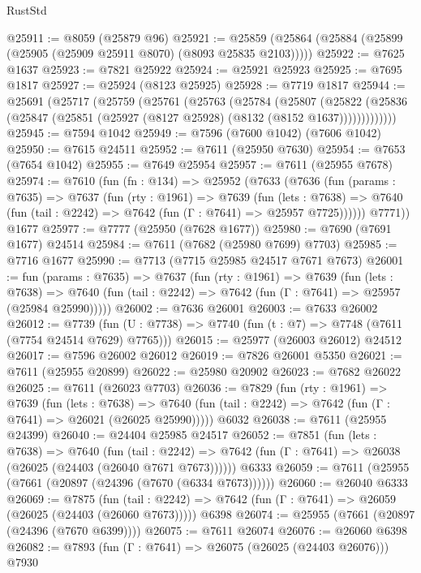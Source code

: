 \begin{lexlean}{RustStd}
\begin{coremodule}
@25911 := @8059 (@25879 @96)
@25921 := @25859 (@25864 (@25884 (@25899 (@25905 (@25909 @25911 @8070) (@8093 @25835 @2103)))))
@25922 := @7625 @1637
@25923 := @7821 @25922
@25924 := @25921 @25923
@25925 := @7695 @1817
@25927 := @25924 (@8123 @25925)
@25928 := @7719 @1817
@25944 := @25691
    (@25717
      (@25759
        (@25761
          (@25763
            (@25784
              (@25807
                (@25822
                  (@25836 (@25847 (@25851 (@25927 (@8127 @25928) (@8132 (@8152 @1637)))))))))))))
@25945 := @7594 @1042
@25949 := @7596 (@7600 @1042) (@7606 @1042)
@25950 := @7615 @24511
@25952 := @7611 (@25950 @7630)
@25954 := @7653 (@7654 @1042)
@25955 := @7649 @25954
@25957 := @7611 (@25955 @7678)
@25974 := @7610
    (fun (fn : @134) =>
    @25952
      (@7633
        (@7636
          (fun (params : @7635) =>
          @7637
            (fun (rty : @1961) =>
            @7639
              (fun (lets : @7638) =>
              @7640 (fun (tail : @2242) => @7642 (fun (Γ : @7641) => @25957 @7725))))))
        @7771))
    @1677
@25977 := @7777 (@25950 (@7628 @1677))
@25980 := @7690 (@7691 @1677) @24514
@25984 := @7611 (@7682 (@25980 @7699) @7703)
@25985 := @7716 @1677
@25990 := @7713 (@7715 @25985 @24517 @7671 @7673)
@26001 := fun (params : @7635) =>
  @7637
    (fun (rty : @1961) =>
    @7639
      (fun (lets : @7638) =>
      @7640 (fun (tail : @2242) => @7642 (fun (Γ : @7641) => @25957 (@25984 @25990)))))
@26002 := @7636 @26001
@26003 := @7633 @26002
@26012 := @7739
    (fun (U : @7738) => @7740 (fun (t : @7) => @7748 (@7611 (@7754 @24514 @7629) @7765)))
@26015 := @25977 (@26003 @26012) @24512
@26017 := @7596 @26002 @26012
@26019 := @7826 @26001 @5350
@26021 := @7611 (@25955 @20899)
@26022 := @25980 @20902
@26023 := @7682 @26022
@26025 := @7611 (@26023 @7703)
@26036 := @7829
    (fun (rty : @1961) =>
    @7639
      (fun (lets : @7638) =>
      @7640 (fun (tail : @2242) => @7642 (fun (Γ : @7641) => @26021 (@26025 @25990)))))
    @6032
@26038 := @7611 (@25955 @24399)
@26040 := @24404 @25985 @24517
@26052 := @7851
    (fun (lets : @7638) =>
    @7640
      (fun (tail : @2242) =>
      @7642 (fun (Γ : @7641) => @26038 (@26025 (@24403 (@26040 @7671 @7673))))))
    @6333
@26059 := @7611 (@25955 (@7661 (@20897 (@24396 (@7670 (@6334 @7673))))))
@26060 := @26040 @6333
@26069 := @7875
    (fun (tail : @2242) => @7642 (fun (Γ : @7641) => @26059 (@26025 (@24403 (@26060 @7673)))))
    @6398
@26074 := @25955 (@7661 (@20897 (@24396 (@7670 @6399))))
@26075 := @7611 @26074
@26076 := @26060 @6398
@26082 := @7893 (fun (Γ : @7641) => @26075 (@26025 (@24403 @26076))) @7930

\end{coremodule}
\end{lexlean}
